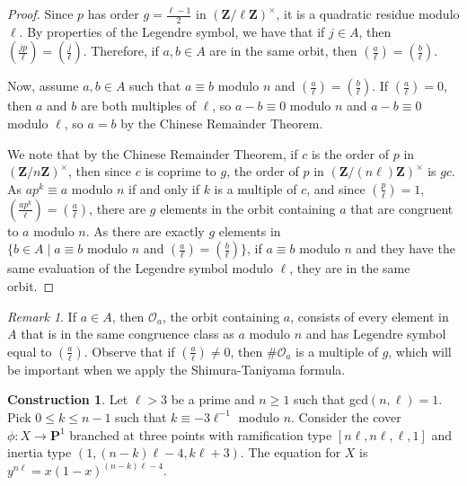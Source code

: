 \documentclass{article}
\theoremstyle{remark}
\newtheorem{remark}[theorem]{Remark}
\theoremstyle{definition}
\newtheorem{construction}[theorem]{Construction}
\begin{document}
\begin{proof}
\par Since $p$ has order $g = \frac{\ell-1}{2}$ in $(\mathbf{Z}/\ell\mathbf{Z})^\times$, it is a quadratic residue modulo $\ell$. By properties of the Legendre symbol, we have that if $j \in A$, then $\left (\frac{jp}{\ell} \right)  = \left (\frac{j}{\ell} \right)$. Therefore, if $a,b \in A$ are in the same orbit, then $\left(\frac{a}{\ell} \right) = \left(\frac{b}{\ell} \right)$.

\par Now, assume $a,b \in A$ such that $a \equiv b$ modulo $n$ and $\left(\frac{a}{\ell} \right) = \left (\frac{b}{\ell} \right)$. If $\left ( \frac{a}{\ell} \right) = 0$, then $a$ and $b$ are both multiples of $\ell$, so $a-b \equiv 0 $ modulo $n$ and $a-b \equiv 0$ modulo $\ell$, so $a = b$ by the Chinese Remainder Theorem.

\par We note that by the Chinese Remainder Theorem, if $c$ is the order of $p$ in $\left(\mathbf{Z}/n\mathbf{Z} \right)^\times$, then since $c$ is coprime to $g$, the order of $p$ in $\left(\mathbf{Z}/(n\ell)\mathbf{Z} \right)^\times$ is $gc$. As $a p^k \equiv a$ modulo $n$ if and only if $k$ is a multiple of $c$, and since $\left (\frac{p}{\ell} \right) = 1$, $\left (\frac{ap^k}{\ell} \right) = \left(\frac{a}{\ell}\right )$, there are $g$ elements in the orbit containing $a$ that are congruent to $a$ modulo $n$. As there are exactly $g$ elements in $\{b \in A \mid a \equiv b \textrm{ modulo } n \textrm{ and } \left (\frac{a}{\ell} \right) = \left(\frac{b}{\ell} \right)\}$, if $a \equiv b$ modulo $n$ and they have the same evaluation of the Legendre symbol modulo $\ell$, they are in the same orbit.
\end{proof}

\begin{remark}
    If $a \in A$, then $\mathcal{O}_a$, the orbit containing $a$, consists of every element in $A$ that is in the same congruence class as $a$ modulo $n$ and has Legendre symbol equal to $\left( \frac{a}{\ell} \right)$. Observe that if $\left( \frac{a}{\ell} \right) \neq 0$, then $\#\mathcal{O}_a$ is a multiple of $g$, which will be important when we apply the Shimura-Taniyama formula.
\end{remark}

\begin{construction}
    \label{construction}
    Let $\ell > 3$ be a prime and $n \geq 1$ such that gcd$(n,\ell) = 1$. Pick $0 \leq k \leq n-1$ such that $k \equiv -3\ell^{-1}$ modulo $n$.  Consider the cover $\phi: X \to \mathbf{P}^1$ branched at three points with ramification type $[n\ell,n\ell,\ell,1]$ and inertia type $(1,(n-k)\ell-4,k\ell+3)$. The equation for $X$ is $y^{n\ell} = x(1-x)^{(n-k)\ell-4}$.
\end{construction}
\end{document}
